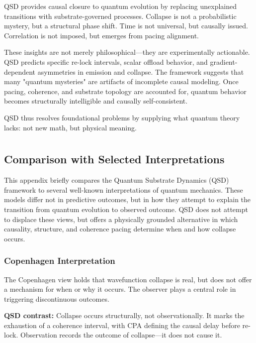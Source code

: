 \documentclass[preprints,article,submit,pdftex,moreauthors]{Definitions/mdpi}
\begin{document}
QSD provides causal closure to quantum evolution by replacing unexplained transitions with substrate-governed processes. Collapse is not a probabilistic mystery, but a structural phase shift. Time is not universal, but causally issued. Correlation is not imposed, but emerges from pacing alignment. 

These insights are not merely philosophical—they are experimentally actionable. QSD predicts specific re-lock intervals, scalar offload behavior, and gradient-dependent asymmetries in emission and collapse. The framework suggests that many "quantum mysteries" are artifacts of incomplete causal modeling. Once pacing, coherence, and substrate topology are accounted for, quantum behavior becomes structurally intelligible and causally self-consistent.

QSD thus resolves foundational problems by supplying what quantum theory lacks: not new math, but physical meaning.


\section[\appendixname~\thesection]{}
\subsection[\appendixname~\thesubsection]{Comparison with Selected Interpretations}

This appendix briefly compares the Quantum Substrate Dynamics (QSD) framework to several well-known interpretations of quantum mechanics. These models differ not in predictive outcomes, but in how they attempt to explain the transition from quantum evolution to observed outcome. QSD does not attempt to displace these views, but offers a physically grounded alternative in which causality, structure, and coherence pacing determine when and how collapse occurs.

\subsubsection{Copenhagen Interpretation}
The Copenhagen view holds that wavefunction collapse is real, but does not offer a mechanism for when or why it occurs. The observer plays a central role in triggering discontinuous outcomes.

\textbf{QSD contrast:} Collapse occurs structurally, not observationally. It marks the exhaustion of a coherence interval, with CPA defining the causal delay before re-lock. Observation records the outcome of collapse—it does not cause it.
\end{document}

